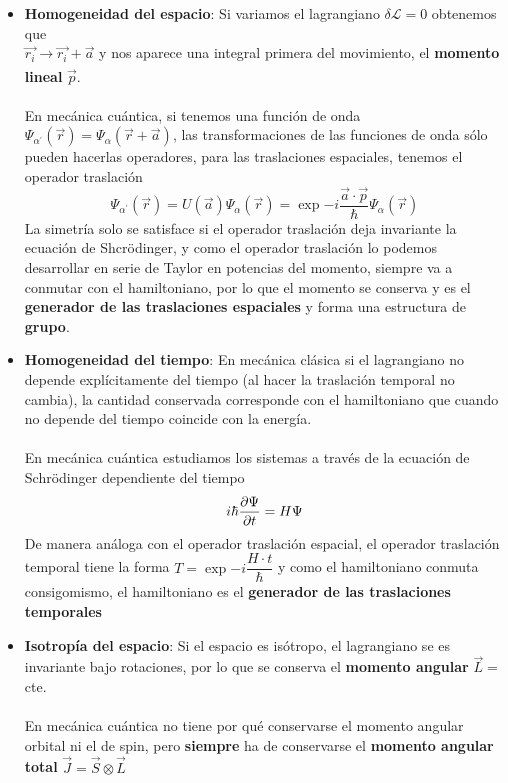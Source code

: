 \begin{itemize}
\item \textbf{Homogeneidad del espacio}: Si variamos el lagrangiano $\delta \mathcal{L}=0$ obtenemos que \\
$\vec{r_i}\xrightarrow[]{} \vec{r_i}+\vec{a}$ y nos aparece una integral primera del movimiento, el \textbf{momento lineal} $\vec{p}$.\\\\ En mecánica cuántica, si tenemos una función de onda $\Psi_{\alpha^\prime}(\vec{r})=\Psi_{\alpha}(\vec{r}+\vec{a})$, las transformaciones de las funciones de onda sólo pueden hacerlas operadores, para las traslaciones espaciales, tenemos el operador traslación $$\Psi_{\alpha^\prime}(\vec{r})=U(\vec{a})\Psi_{\alpha}(\vec{r})=\exp{-i\frac{\vec{a}\cdot \vec{p}}{\hbar}} \Psi_{\alpha}(\vec{r})$$
La simetría solo se satisface si el operador traslación deja invariante la ecuación de Shcrödinger, y como el operador traslación lo podemos desarrollar en serie de Taylor en potencias del momento, siempre va a conmutar con el hamiltoniano, por lo que el momento se conserva y es el \textbf{generador de las traslaciones espaciales} y forma una estructura de \textbf{grupo}.
    \item \textbf{Homogeneidad del tiempo}: En mecánica clásica si el lagrangiano no depende explícitamente del tiempo (al hacer la traslación temporal no cambia), la cantidad conservada corresponde con el hamiltoniano que cuando no depende del tiempo coincide con la energía.\\\\
    En mecánica cuántica estudiamos los sistemas a través de la ecuación de Schrödinger dependiente del tiempo
    \begin{equation*}
        i\hbar \pdv{\Psi}{t}=H\Psi
    \end{equation*}
    De manera análoga con el operador traslación espacial, el operador traslación temporal tiene la forma $T=\exp{-i\dfrac{H\cdot t}{\hbar}}$ y como el hamiltoniano conmuta consigomismo, el hamiltoniano es el \textbf{generador de las traslaciones temporales}
    \item \textbf{Isotropía del espacio}: Si el espacio es isótropo, el lagrangiano se es invariante bajo rotaciones, por lo que se conserva el \textbf{momento angular} $\vec{L}=$cte.\\\\ En mecánica cuántica no tiene por qué conservarse el momento angular orbital ni el de spin, pero \textbf{siempre} ha de conservarse el \textbf{momento angular total} $\vec{J}=\vec{S}\otimes \vec{L}$
\end{itemize}
